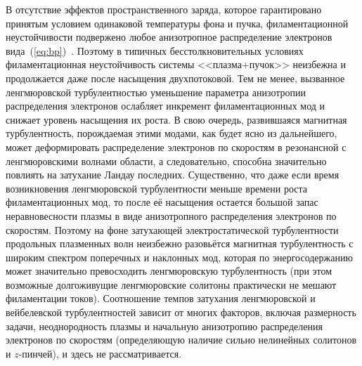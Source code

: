 В отсутствие эффектов пространственного заряда, которое гарантировано принятым условием одинаковой температуры фона и пучка, филаментационной неустойчивости подвержено любое анизотропное распределение электронов вида~(\ref{eq:bp})~\cite{Tzoufras2006}. Поэтому в типичных бесстолкновительных условиях филаментационная неустойчивость системы <<плазма+пучок>> неизбежна и продолжается даже после насыщения двухпотоковой. Тем не менее, вызванное ленгмюровской турбулентностью уменьшение параметра анизотропии распределения электронов ослабляет инкремент филаментационных мод и снижает уровень насыщения их роста. В свою очередь, развившаяся магнитная турбулентность, порождаемая этими модами, как будет ясно из дальнейшего, может деформировать распределение электронов по скоростям в резонансной с ленгмюровскими волнами области, а следовательно, способна значительно повлиять на затухание Ландау последних. Существенно, что даже если время возникновения ленгмюровской турбулентности меньше времени роста филаментационных мод, то после её насыщения остается большой запас неравновесности плазмы в виде анизотропного распределения электронов по скоростям. Поэтому на фоне затухающей электростатической турбулентности продольных плазменных волн неизбежно разовьётся магнитная турбулентность с широким спектром поперечных и наклонных мод, которая по энергосодержанию может значительно превосходить ленгмюровскую турбулентность (при этом возможные долгоживущие ленгмюровские солитоны практически не мешают филаментации токов). Соотношение темпов затухания ленгмюровской и вейбелевской турбулентностей зависит от многих факторов, включая размерность задачи, неоднородность плазмы и начальную анизотропию распределения электронов по скоростям (определяющую наличие сильно нелинейных солитонов и $z$-пинчей), и здесь не рассматривается.

